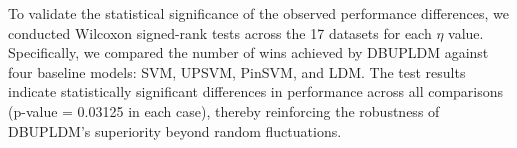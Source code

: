 \documentclass[a4paper]{cas-sc}
\begin{document}
{\color{blue}To validate the statistical significance of the observed performance differences, we conducted Wilcoxon signed-rank tests across the 17 datasets for each $\eta$ value. Specifically, we compared the number of wins achieved by DBUPLDM against four baseline models: SVM, UPSVM, PinSVM, and LDM. The test results indicate statistically significant differences in performance across all comparisons (p-value = 0.03125 in each case), thereby reinforcing the robustness of DBUPLDM’s superiority beyond random fluctuations.}




\end{document}
